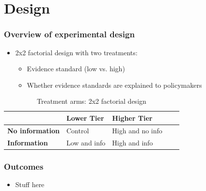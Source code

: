 \documentclass[usenames,dvipsnames]{beamer}
\begin{document}

\section{Design}

\begin{frame}
\frametitle{Overview of experimental design}

\begin{itemize}
\item 2x2 factorial design with two treatments:
\begin{itemize}
\item Evidence standard (low vs. high)
\item Whether evidence standards are explained to policymakers
\end{itemize}
\end{itemize}

\begin{table}[H]
\centering
\caption{Treatment arms: 2x2 factorial design}
\vspace{-7mm}
\label{tab: arms} 
\bigbreak
\begin{tabular}{|l|l|l|l|l|}
\hline
& \textbf{Lower Tier} & \textbf{Higher Tier} \\ \hline
\textbf{No information} & Control & High and no info \\ \hline
\textbf{Information} & Low and info & High and info \\ \hline
\end{tabular}
\end{table}

\end{frame}


\begin{frame}
\frametitle{Outcomes}

\begin{itemize}
\item Stuff here
\end{itemize}

\end{frame}


\end{document}
